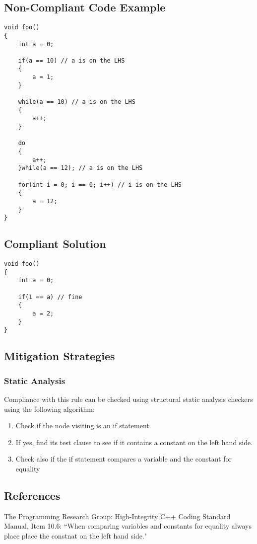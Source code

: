 \subsection{Non-Compliant Code Example}


\begin{verbatim}
void foo()
{
	int a = 0;

	if(a == 10) // a is on the LHS
	{
		a = 1;
	}
	
	while(a == 10) // a is on the LHS
	{
		a++;
	}

	do
	{
		a++;
	}while(a == 12); // a is on the LHS

	for(int i = 0; i == 0; i++) // i is on the LHS
	{
		a = 12;
	}
}
\end{verbatim}

\subsection{Compliant Solution}


\begin{verbatim}
void foo()
{
	int a = 0;

	if(1 == a) // fine
	{
		a = 2;
	}
}
\end{verbatim}

\subsection{Mitigation Strategies}
\subsubsection{Static Analysis} 

Compliance with this rule can be checked using structural static analysis checkers using the following algorithm:

\begin{enumerate}
\item Check if the node visiting is an if statement.
\item If yes, find its test clause to see if it contains a constant on the left hand side.
\item Check also if the if statement compares a variable and the constant for equality
\end{enumerate}

\subsection{References}

The Programming Research Group: High-Integrity C++ Coding Standard Manual, Item 10.6: ``When comparing variables and constants for equality always place place the constnat on the left hand side."
